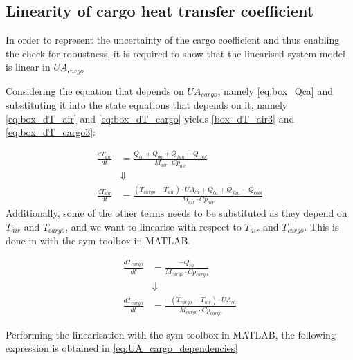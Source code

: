 \subsection{Linearity of cargo heat transfer coefficient} \label{sec:app:cargoHeat}
In order to represent the uncertainty of the cargo coefficient and thus enabling the check for robustness, it is required to show that the linearised system model is linear in $ UA_{cargo} $

Considering the equation that depends on $ UA_{cargo} $, namely \cref{eq:box_Qca} and substituting it into the state equations that depends on it, namely \cref{eq:box_dT_air} and \cref{eq:box_dT_cargo} yields \cref{box_dT_air3} and \cref{eq:box_dT_cargo3}:

\begin{align}
	\frac{dT_{air}}{dt} & = \frac{Q_{ca} + Q_{ba} + Q_{fan} -Q_{cool}}{M_{air} \cdot Cp_{air}} \label{eq:box_dT_air2} \\
	& \Downarrow \nonumber \\
	\frac{dT_{air}}{dt} & = \frac{(T_{cargo} - T_{air}) \cdot U A_{ca} + Q_{ba} + Q_{fan} -Q_{cool}}{M_{air} \cdot Cp_{air}} \label{eq:box_dT_air3}
\end{align}
Additionally, some of the other terms needs to be substituted as they depend on $ T_{air} $ and $ T_{cargo} $, and we want to linearise with respect to $ T_{air} $ and $ T_{cargo} $. This is done in with the sym toolbox in MATLAB.

\begin{align}
	\frac{dT_{cargo}}{dt} & = \frac{-Q_{ca}}{M_{cargo} \cdot Cp_{cargo}} \label{eq:box_dT_cargo2} \\
	& \Downarrow \nonumber \\
	\frac{dT_{cargo}}{dt} & = \frac{-(T_{cargo} - T_{air}) \cdot U A_{ca} }{M_{cargo} \cdot Cp_{cargo}} \label{eq:box_dT_cargo3}
\end{align}

Performing the linearisation with the sym toolbox in MATLAB, the following expression is obtained in \cref{eq:UA_cargo_dependencies}

